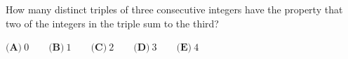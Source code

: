 How many distinct triples of three consecutive integers have the property that two of the integers in the triple sum to the third?

$\textbf{(A)}\ 0\qquad\textbf{(B)}\ 1\qquad\textbf{(C)}\ 2\qquad\textbf{(D)}\ 3\qquad\textbf{(E)}\ 4$
